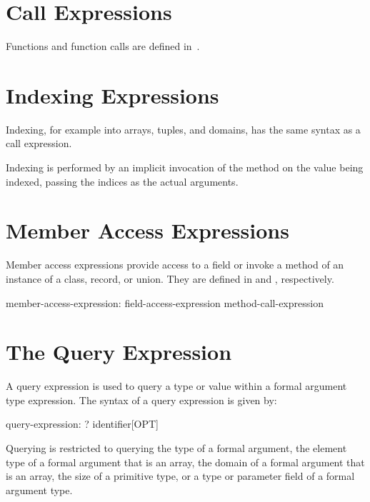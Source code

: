 \section{Call Expressions}
\label{Call_Expressions}

Functions and function calls are defined in~.

\section{Indexing Expressions}
\label{Indexing_Expressions}

Indexing, for example into arrays, tuples, and domains,
has the same syntax as a call expression.
 
Indexing is performed by an implicit invocation of the  method
on the value being indexed,
passing the indices as the actual arguments.

\section{Member Access Expressions}
\label{Member_Access_Expressions}

Member access expressions provide access to a field or invoke a method
of an instance of a class, record, or union.
They are defined in  and
, respectively.

\begin{syntax}
member-access-expression:
  field-access-expression
  method-call-expression
\end{syntax}

\section{The Query Expression}
\label{The_Query_Expression}

A query expression is used to query a type or value within a formal
argument type expression.  The syntax of a query expression is given
by:
\begin{syntax}
query-expression:
  ? identifier[OPT]
\end{syntax}
Querying is restricted to querying the type of a formal argument, the
element type of a formal argument that is an array, the domain of a
formal argument that is an array, the size of a primitive type, or a
type or parameter field of a formal argument type.

